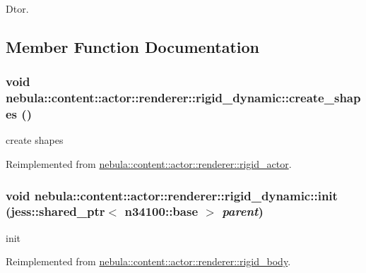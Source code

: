 Dtor. 

\subsection{Member Function Documentation}
\hypertarget{classnebula_1_1content_1_1actor_1_1renderer_1_1rigid__dynamic_adb6f10e76d5854f424b7e44db595f4b7}{
\subsubsection[{create\_\-shapes}]{\setlength{\rightskip}{0pt plus 5cm}void nebula::content::actor::renderer::rigid\_\-dynamic::create\_\-shapes ()}}
\label{classnebula_1_1content_1_1actor_1_1renderer_1_1rigid__dynamic_adb6f10e76d5854f424b7e44db595f4b7}


create shapes 

Reimplemented from \hyperlink{classnebula_1_1content_1_1actor_1_1renderer_1_1rigid__actor_a1f1c2c451ac3c5cf9bd67e7e15f3df5f}{nebula::content::actor::renderer::rigid\_\-actor}.\hypertarget{classnebula_1_1content_1_1actor_1_1renderer_1_1rigid__dynamic_ab957f8a465493d2a9d7a2f0015d4a5ea}{
\subsubsection[{init}]{\setlength{\rightskip}{0pt plus 5cm}void nebula::content::actor::renderer::rigid\_\-dynamic::init (jess::shared\_\-ptr$<$ {\bf n34100::base} $>$ {\em parent})}}
\label{classnebula_1_1content_1_1actor_1_1renderer_1_1rigid__dynamic_ab957f8a465493d2a9d7a2f0015d4a5ea}


init 

Reimplemented from \hyperlink{classnebula_1_1content_1_1actor_1_1renderer_1_1rigid__body_afd1175cdc7b35a918db4bd89c59463f0}{nebula::content::actor::renderer::rigid\_\-body}.

